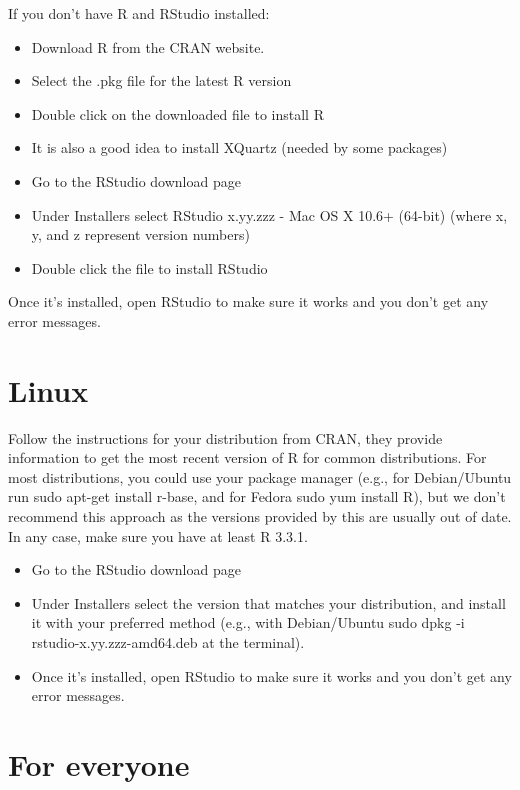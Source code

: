 \documentclass[]{book}
\providecommand{\tightlist}{%
  \setlength{\itemsep}{0pt}\setlength{\parskip}{0pt}}
\begin{document}
If you don't have R and RStudio installed:

\begin{itemize}
\tightlist
\item
  Download R from the CRAN website.
\item
  Select the .pkg file for the latest R version
\item
  Double click on the downloaded file to install R
\item
  It is also a good idea to install XQuartz (needed by some packages)
\item
  Go to the RStudio download page
\item
  Under Installers select RStudio x.yy.zzz - Mac OS X 10.6+ (64-bit) (where x, y, and z represent version numbers)
\item
  Double click the file to install RStudio
\end{itemize}

Once it's installed, open RStudio to make sure it works and you don't get any error messages.

\hypertarget{linux}{%
\section{Linux}\label{linux}}

Follow the instructions for your distribution from CRAN, they provide information to get the most recent version of R for common distributions. For most distributions, you could use your package manager (e.g., for Debian/Ubuntu run sudo apt-get install r-base, and for Fedora sudo yum install R), but we don't recommend this approach as the versions provided by this are usually out of date. In any case, make sure you have at least R 3.3.1.

\begin{itemize}
\tightlist
\item
  Go to the RStudio download page
\item
  Under Installers select the version that matches your distribution, and install it with your preferred method (e.g., with Debian/Ubuntu sudo dpkg -i rstudio-x.yy.zzz-amd64.deb at the terminal).
\item
  Once it's installed, open RStudio to make sure it works and you don't get any error messages.
\end{itemize}

\hypertarget{for-everyone}{%
\section{For everyone}\label{for-everyone}}
\end{document}

